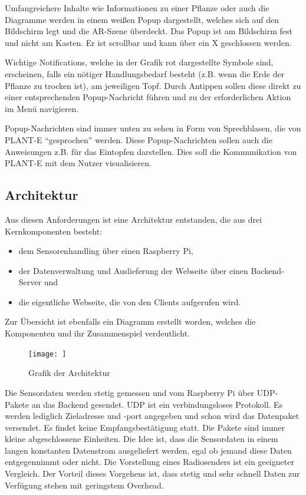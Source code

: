 Umfangreichere Inhalte wie Informationen zu einer Pflanze oder auch die
Diagramme werden in einem weißen Popup dargestellt, welches sich auf den
Bildschirm legt und die AR-Szene überdeckt. Das Popup ist am Bildschirm
fest und nicht am Kasten. Er ist scrollbar und kann über ein X
geschlossen werden.

Wichtige Notifications, welche in der Grafik rot dargestellte Symbole
sind, erscheinen, falls ein nötiger Handlungsbedarf besteht (z.B. wenn
die Erde der Pflanze zu trocken ist), am jeweiligen Topf. Durch Antippen
sollen diese direkt zu einer entsprechenden Popup-Nachricht führen und
zu der erforderlichen Aktion im Menü navigieren.

Popup-Nachrichten sind immer unten zu sehen in Form von Sprechblasen,
die von PLANT-E ``gesprochen'' werden. Diese Popup-Nachrichten sollen
auch die Anweisungen z.B. für das Eintopfen darstellen. Dies soll die
Kommunikation von PLANT-E mit dem Nutzer visualisieren.

\hypertarget{architektur}{%
\subsection{Architektur}\label{architektur}}

Aus diesen Anforderungen ist eine Architektur entstanden, die aus drei
Kernkomponenten besteht:

\begin{itemize}
\tightlist
\item
  dem Sensorenhandling über einen Raspberry Pi,
\item
  der Datenverwaltung und Auslieferung der Webseite über einen
  Backend-Server und
\item
  die eigentliche Webseite, die von den Clients aufgerufen wird.
\end{itemize}

Zur Übersicht ist ebenfalls ein Diagramm erstellt worden, welches die
Komponenten und ihr Zusammenspiel verdeutlicht.

\begin{figure}
\centering
\texttt{[image: ]}
\caption{Grafik der Architektur}
\end{figure}

Die Sensordaten werden stetig gemessen und vom Raspberry Pi über
UDP-Pakete an das Backend gesendet. UDP ist ein verbindungsloses
Protokoll. Es werden lediglich Zieladresse und -port angegeben und schon
wird das Datenpaket versendet. Es findet keine Empfangsbestätigung
statt. Die Pakete sind immer kleine abgeschlossene Einheiten. Die Idee
ist, dass die Sensordaten in einem langen konstanten Datenstrom
ausgeliefert werden, egal ob jemand diese Daten entgegennimmt oder
nicht. Die Vorstellung eines Radiosenders ist ein geeigneter Vergleich.
Der Vorteil dieses Vorgehens ist, dass stetig und sehr schnell Daten zur
Verfügung stehen mit geringstem Overhead.

